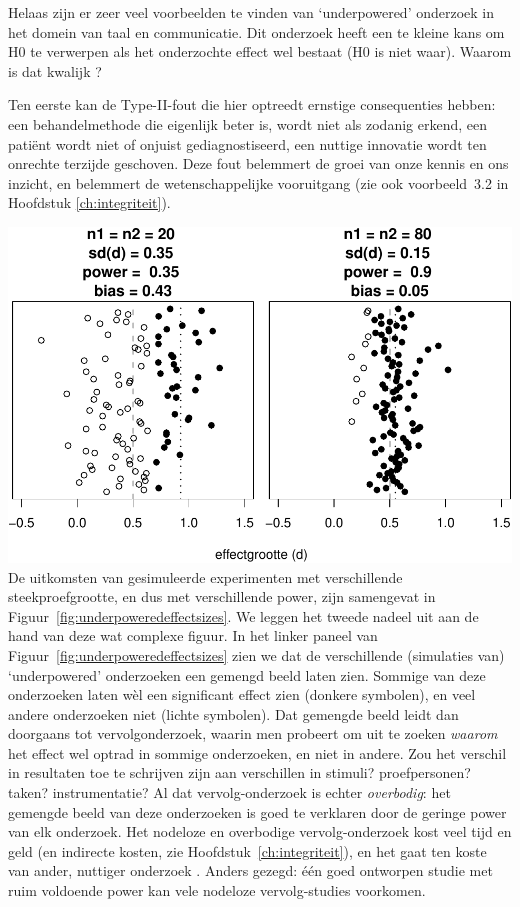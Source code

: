 \documentclass[
]{book}
\begin{document}
Helaas zijn er zeer veel voorbeelden te vinden van `underpowered'
onderzoek in het domein van taal en communicatie. Dit onderzoek heeft
een te kleine kans om H0 te verwerpen als het onderzochte effect wel
bestaat (H0 is niet waar). Waarom is dat kwalijk \citep{Quene10}?

Ten eerste kan de Type-II-fout die hier optreedt ernstige consequenties
hebben: een behandelmethode die eigenlijk beter is, wordt niet als
zodanig erkend, een patiënt wordt niet of onjuist gediagnostiseerd, een
nuttige innovatie wordt ten onrechte terzijde geschoven. Deze fout
belemmert de groei van onze kennis en ons inzicht, en belemmert de
wetenschappelijke vooruitgang (zie ook
voorbeeld~3.2 in Hoofdstuk \ref{ch:integriteit}).

\includegraphics{KMS-NL_files/figure-latex/underpoweredeffectsizes-1.pdf}
De uitkomsten van gesimuleerde experimenten met verschillende
steekproefgrootte, en dus met verschillende power, zijn samengevat in
Figuur~\ref{fig:underpoweredeffectsizes}. We leggen het tweede nadeel uit aan de hand van deze wat complexe figuur. In het linker paneel van
Figuur~\ref{fig:underpoweredeffectsizes} zien we dat de verschillende
(simulaties van) `underpowered' onderzoeken een gemengd beeld laten
zien. Sommige van deze onderzoeken laten wèl een significant effect zien
(donkere symbolen), en veel andere onderzoeken niet (lichte symbolen).
Dat gemengde beeld leidt dan doorgaans tot vervolgonderzoek, waarin men
probeert om uit te zoeken \emph{waarom} het effect wel optrad in sommige
onderzoeken, en niet in andere. Zou het verschil in resultaten toe te
schrijven zijn aan verschillen in stimuli? proefpersonen? taken?
instrumentatie? Al dat vervolg-onderzoek is echter \emph{overbodig}: het
gemengde beeld van deze onderzoeken is goed te verklaren door de geringe
power van elk onderzoek. Het nodeloze en overbodige vervolg-onderzoek
kost veel tijd en geld (en indirecte kosten, zie
Hoofdstuk~\ref{ch:integriteit}), en het gaat ten koste van ander, nuttiger
onderzoek \citep[p.118]{Schm96}. Anders gezegd: één goed ontworpen studie met
ruim voldoende power kan vele nodeloze vervolg-studies voorkomen.
\end{document}
